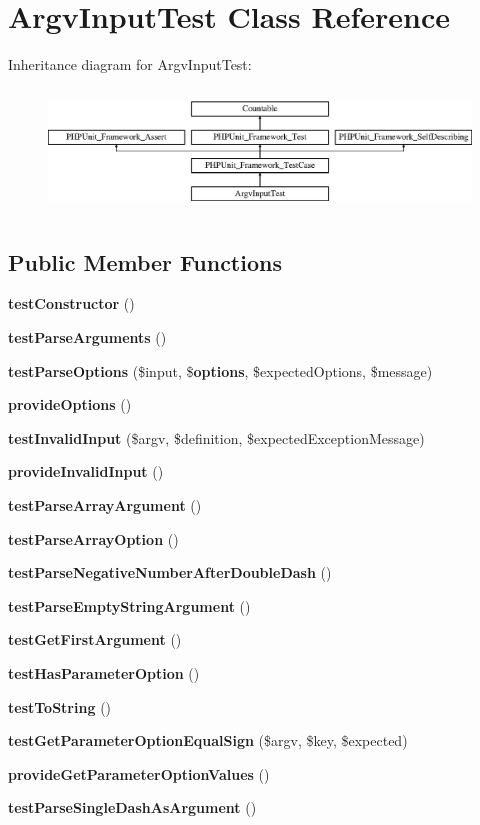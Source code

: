 \section{Argv\+Input\+Test Class Reference}
\label{class_symfony_1_1_component_1_1_console_1_1_tests_1_1_input_1_1_argv_input_test}
Inheritance diagram for Argv\+Input\+Test\+:\begin{figure}[H]
\begin{center}
\leavevmode
\includegraphics[height=3.303835cm]{class_symfony_1_1_component_1_1_console_1_1_tests_1_1_input_1_1_argv_input_test}
\end{center}
\end{figure}
\subsection*{Public Member Functions}
\begin{DoxyCompactItemize}
\item 
{\bf test\+Constructor} ()
\item 
{\bf test\+Parse\+Arguments} ()
\item 
{\bf test\+Parse\+Options} (\$input, \${\bf options}, \$expected\+Options, \$message)
\item 
{\bf provide\+Options} ()
\item 
{\bf test\+Invalid\+Input} (\$argv, \$definition, \$expected\+Exception\+Message)
\item 
{\bf provide\+Invalid\+Input} ()
\item 
{\bf test\+Parse\+Array\+Argument} ()
\item 
{\bf test\+Parse\+Array\+Option} ()
\item 
{\bf test\+Parse\+Negative\+Number\+After\+Double\+Dash} ()
\item 
{\bf test\+Parse\+Empty\+String\+Argument} ()
\item 
{\bf test\+Get\+First\+Argument} ()
\item 
{\bf test\+Has\+Parameter\+Option} ()
\item 
{\bf test\+To\+String} ()
\item 
{\bf test\+Get\+Parameter\+Option\+Equal\+Sign} (\$argv, \$key, \$expected)
\item 
{\bf provide\+Get\+Parameter\+Option\+Values} ()
\item 
{\bf test\+Parse\+Single\+Dash\+As\+Argument} ()
\end{DoxyCompactItemize}
